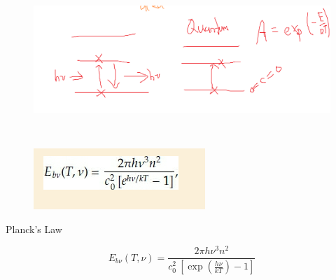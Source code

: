 \documentclass[12pt]{article}
\renewcommand{\_}{\kern-1.5pt\textunderscore\kern-1.5pt}
\begin{document}
\begin{itemize}
\begin{figure}[H]
	\begin{Center}
		\includegraphics[width=6.27in,height=2.26in]{./media/image7.png}
	\end{Center}
\end{figure}



\par




\newpage

\vspace{\baselineskip}


\begin{figure}[H]
	\begin{Center}
		\includegraphics[width=2.55in,height=0.91in]{./media/image8.png}
	\end{Center}
\end{figure}



\par

Planck’s Law\par


\vspace{\baselineskip}
 \[ E_{b \nu } \left( T, \nu  \right) =\frac{2 \pi h \nu ^{3}n^{2}}{c_{0}^{2}~ \left[ \exp  \left( \frac{h \nu }{kT} \right) -1 \right] } \] \par


\end{itemize}
\end{document}
